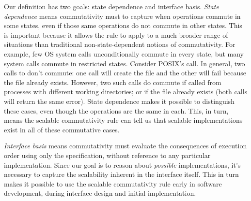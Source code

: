 Our definition has two goals: state dependence and interface basis.
%
\emph{State dependence} means \SIM commutativity must to capture when
operations commute in some states, even if those same operations do
not commute in other states.
%
This is important because it allows the rule to apply to a much
broader range of
situations than traditional non-state-dependent notions of
commutativity.
%
For example, few OS system calls unconditionally commute in
every state, but many system calls commute in restricted states.
%
Consider POSIX's  call.
%
In general, two calls to  don't
commute: one call will create the file and the other will
fail because the file already exists.
%
However, two such calls do commute if called from processes with
different working directories; or if the file  already
exists (both calls will return the same error).
%
  
%
State dependence makes it possible to distinguish these cases, even
though the
operations are the same in each.  This, in turn, means the scalable
commutativity
rule can tell us that scalable implementations exist in all of these
commutative
cases.
%

\emph{Interface basis} means \SIM commutativity must
evaluate the consequences of execution order using only the
specification, without reference to any particular implementation.
%
Since our goal is to reason about
\emph{possible} implementations, it's necessary to capture the
scalability inherent in the interface
itself.
%
This in turn makes it
possible to use the scalable commutativity rule early in software development,
during interface design and initial implementation.
%

